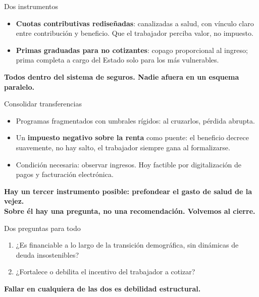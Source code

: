 \documentclass[aspectratio=169,11pt]{beamer}
\newcommand{\clave}[1]{\textcolor{acento}{\textbf{#1}}}
\newcommand{\destacar}[1]{\vspace{0.6em}\begin{center}\textbf{#1}\end{center}}
\newcommand{\frase}[1]{\begin{center}\Large\textbf{#1}\end{center}}
\begin{document}
\begin{frame}{Dos instrumentos}
  \begin{itemize}
    \item \clave{Cuotas contributivas rediseñadas}: canalizadas a salud, con vínculo claro entre contribución y beneficio. Que el trabajador perciba valor, no impuesto.
    \item \clave{Primas graduadas para no cotizantes}: copago proporcional al ingreso; prima completa a cargo del Estado solo para los más vulnerables.
  \end{itemize}
  \destacar{Todos dentro del sistema de seguros. Nadie afuera en un esquema paralelo.}
\end{frame}

\begin{frame}{Consolidar transferencias}
  \begin{itemize}
    \item Programas fragmentados con umbrales rígidos: al cruzarlos, pérdida abrupta.
    \item Un \clave{impuesto negativo sobre la renta} como puente: el beneficio decrece suavemente, no hay salto, el trabajador siempre gana al formalizarse.
    \item Condición necesaria: observar ingresos. Hoy factible por digitalización de pagos y facturación electrónica.
  \end{itemize}
\end{frame}

\begin{frame}[plain]
  \vfill
  \frase{Hay un tercer instrumento posible: prefondear el gasto de salud de la vejez.\\[0.6em]
  \normalsize\normalfont Sobre él hay una pregunta, no una recomendación. Volvemos al cierre.}
  \vfill
\end{frame}


\begin{frame}{Dos preguntas para todo}
  \begin{enumerate}
    \item ¿Es financiable a lo largo de la transición demográfica, sin dinámicas de deuda insostenibles?
    \item ¿Fortalece o debilita el incentivo del trabajador a cotizar?
  \end{enumerate}
  \destacar{Fallar en cualquiera de las dos es debilidad estructural.}
\end{frame}
\end{document}
